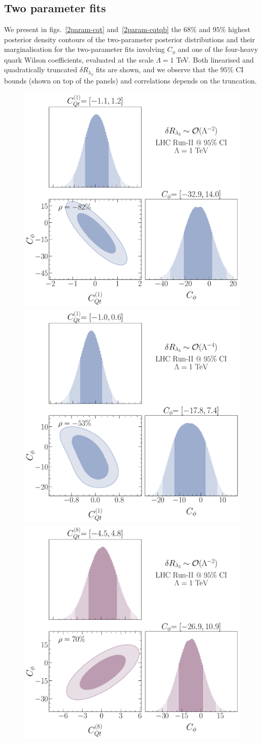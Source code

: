\subsection{Two parameter fits \label{App:fitplots}}

We present in figs.~\ref{2param-cqt} and~\ref{2param-cqtqb} the $68\%$ and $ 95\%$  highest posterior density contours of the two-parameter posterior distributions and their marginalisation for the two-parameter fits involving $C_\phi$ and one of the four-heavy quark Wilson coefficients, evaluated at the scale $\Lambda=1$ TeV.  
Both linearised and quadratically truncated $\delta R_{\lambda_3}$ fits are shown, and we observe that the $95\%$ CI bounds (shown on top of the panels) and correlations depends on the truncation.

\begin{figure}[h!]
	\begin{center}
		\includegraphics[width=0.45\linewidth]{fig/Cqt1_LHC_RunII_linearl3_rge}
		\includegraphics[width=0.45\linewidth]{fig/Cqt1_LHC_RunII_quadl3_rge} \\ 
		\includegraphics[width=0.45\linewidth]{fig/Cqt8_LHC_RunII_linearl3_rge}

\end{center}
\end{figure}
